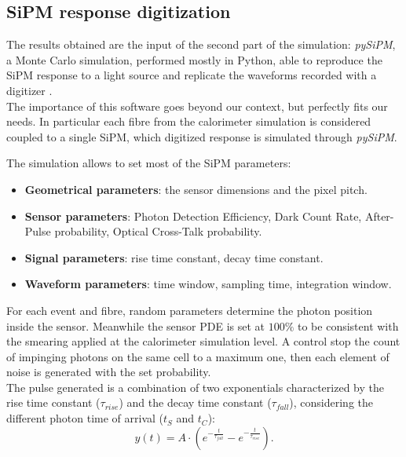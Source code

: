 \subsection{SiPM response digitization} \label{subsec:Sim_SiPM}
The results obtained are the input of the second part of the simulation: \textit{pySiPM}, a Monte Carlo simulation, performed mostly in Python, able to reproduce the SiPM response to a light source and replicate the waveforms recorded with a digitizer \cite{digitizer}.\\

The importance of this software goes beyond our context, but perfectly fits our needs. In particular each fibre from the calorimeter simulation is considered coupled to a single SiPM, which digitized response is simulated through \textit{pySiPM}.

The simulation allows to set most of the SiPM parameters:
\begin{itemize}
	\item \textbf{Geometrical parameters}: the sensor dimensions and the pixel pitch.
	\item \textbf{Sensor parameters}: Photon Detection Efficiency, Dark Count Rate, After-Pulse probability, Optical Cross-Talk probability.
	\item \textbf{Signal parameters}: rise time constant, decay time constant.
	\item \textbf{Waveform parameters}: time window, sampling time, integration window.
\end{itemize}

For each event and fibre, random parameters determine the photon position inside the sensor. %
Meanwhile the sensor PDE is set at $100\%$ to be consistent with the smearing applied at the calorimeter simulation level.
A control stop the count of impinging photons on the same cell to a maximum one, then each element of noise is generated with the set probability.\\
The pulse generated is a combination of two exponentials characterized by the rise time constant ($\tau_{rise}$) and the decay time constant ($\tau_{fall}$), considering the different photon time of arrival ($t_S$ and $t_C$):
\begin{equation}
	y(t)= A \cdot \left( e^{-\frac{t}{\tau_{fall}}} - e^{-\frac{t}{\tau_{rise}}}\right).
	\label{form:resp_func}
\end{equation}

